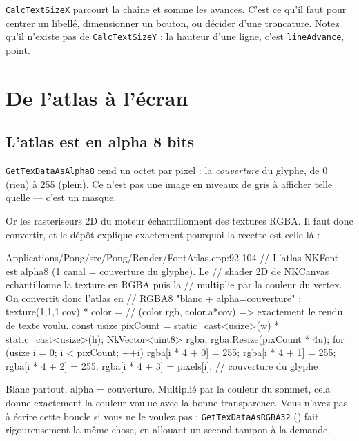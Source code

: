 \texttt{CalcTextSizeX} parcourt la chaîne et somme les avances. C'est ce qu'il
faut pour centrer un libellé, dimensionner un bouton, ou décider d'une
troncature. Notez qu'il n'existe pas de \texttt{CalcTextSizeY} : la hauteur d'une
ligne, c'est \texttt{lineAdvance}, point.

\section{De l'atlas à l'écran}

\subsection{L'atlas est en alpha 8 bits}

\texttt{GetTexDataAsAlpha8} rend un octet par pixel : la \emph{couverture} du
glyphe, de 0 (rien) à 255 (plein). Ce n'est pas une image en niveaux de gris à
afficher telle quelle — c'est un masque.

Or les rasteriseurs 2D du moteur échantillonnent des textures RGBA. Il faut donc
convertir, et le dépôt explique exactement pourquoi la recette est celle-là :

\begin{nkcode}{Applications/Pong/src/Pong/Render/FontAtlas.cpp:92-104}
            // L'atlas NKFont est alpha8 (1 canal = couverture du glyphe). Le
            // shader 2D de NKCanvas echantillonne la texture en RGBA puis la
            // multiplie par la couleur du vertex. On convertit donc l'atlas en
            // RGBA8 "blanc + alpha=couverture" : texture(1,1,1,cov) * color =
            // (color.rgb, color.a*cov) => exactement le rendu de texte voulu.
            const usize pixCount = static_cast<usize>(w) * static_cast<usize>(h);
            NkVector<uint8> rgba;
            rgba.Resize(pixCount * 4u);
            for (usize i = 0; i < pixCount; ++i) {
                rgba[i * 4 + 0] = 255;
                rgba[i * 4 + 1] = 255;
                rgba[i * 4 + 2] = 255;
                rgba[i * 4 + 3] = pixels[i]; // couverture du glyphe
            }
\end{nkcode}

Blanc partout, alpha = couverture. Multiplié par la couleur du sommet, cela
donne exactement la couleur voulue avec la bonne transparence. Vous n'avez pas à
écrire cette boucle si vous ne le voulez pas : \texttt{GetTexDataAsRGBA32}
() fait rigoureusement la même chose, en allouant
un second tampon à la demande.


